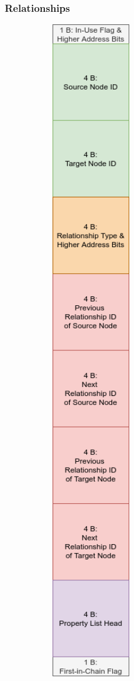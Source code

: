 \documentclass[a4paper,10pt]{article}
\begin{document}
            
        
        \subsubsection{Relationships}
            \begin{figure}[htp]\label{rel_record}
                \begin{center}
                    \includegraphics[keepaspectratio,height=0.9\textheight,width=0.5\textwidth]{img/03_record/relationship/relationship_record.png}

\end{center}
\end{figure}
\end{document}
